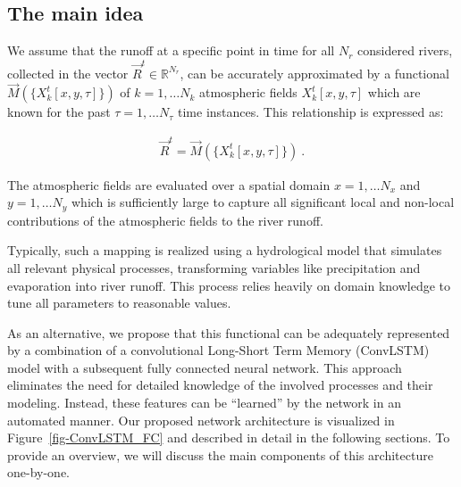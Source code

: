 \documentclass[
]{agujournal2019}
\begin{document}
\hypertarget{sec-main_idea}{%
\subsection{The main idea}\label{sec-main_idea}}

We assume that the runoff at a specific point in time for all \(N_r\)
considered rivers, collected in the vector
\(\vec{R}^t \in \mathbb{R}^{N_r}\), can be accurately approximated by a
functional \(\vec{M}(\{X^t_k[x,y,\tau]\})\) of \(k=1,\ldots N_k\)
atmospheric fields \(X^t_k[x,y,\tau]\) which are known for the past
\(\tau=1,\ldots N_\tau\) time instances. This relationship is expressed
as:

\[
\begin{aligned}
\vec{R}^t = \vec{M}(\{X^t_k[x,y,\tau]\}) \ .
\end{aligned}
\]

The atmospheric fields are evaluated over a spatial domain
\(x=1,\ldots N_x\) and \(y=1,\ldots N_y\) which is sufficiently large to
capture all significant local and non-local contributions of the
atmospheric fields to the river runoff.

Typically, such a mapping is realized using a hydrological model that
simulates all relevant physical processes, transforming variables like
precipitation and evaporation into river runoff. This process relies
heavily on domain knowledge to tune all parameters to reasonable values.

As an alternative, we propose that this functional can be adequately
represented by a combination of a convolutional Long-Short Term Memory
(ConvLSTM) model with a subsequent fully connected neural network. This
approach eliminates the need for detailed knowledge of the involved
processes and their modeling. Instead, these features can be ``learned''
by the network in an automated manner. Our proposed network architecture
is visualized in Figure~\ref{fig-ConvLSTM_FC} and described in detail in
the following sections. To provide an overview, we will discuss the main
components of this architecture one-by-one.
\end{document}
